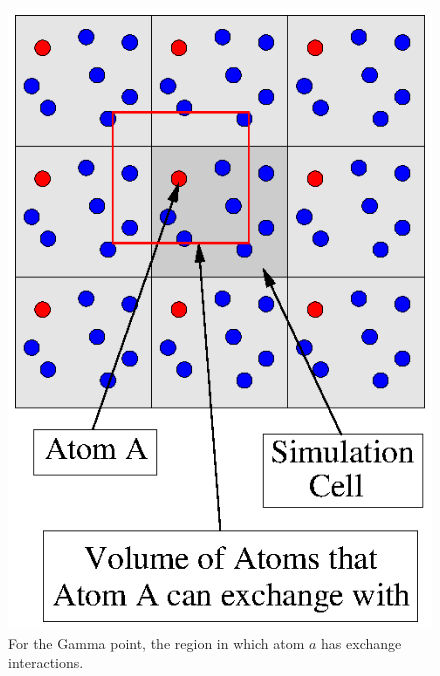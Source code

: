 \documentclass[prb,aps,nobibnotes,twocolumn,doublespace,twocolumngrid,superbib]{revtex4}
\begin{document}
\begin{figure}
\caption{For the Gamma point, the region in which atom $a$ has exchange interactions.}
\label{figure:ExchangeRegion}
{\centering \includegraphics{ExchangeRegion.ps} \par}
\end{figure}
%
%
%
\end{document}
